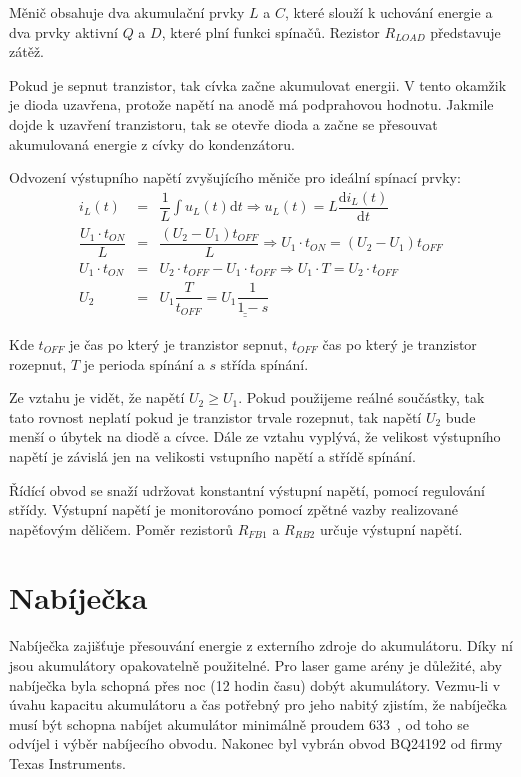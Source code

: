 Měnič obsahuje dva akumulační prvky $L$ a $C$, které slouží k uchování energie a dva prvky aktivní $Q$ a $D$, které plní funkci spínačů. Rezistor $R_{LOAD}$ představuje zátěž.

Pokud je sepnut tranzistor, tak cívka začne akumulovat energii. V tento okamžik je dioda uzavřena, protože napětí na anodě má podprahovou hodnotu. Jakmile dojde k uzavření tranzistoru, tak se otevře dioda a začne se přesouvat akumulovaná energie z cívky do kondenzátoru.

Odvození výstupního napětí zvyšujícího měniče pro ideální spínací prvky:
\begin{eqnarray}
    i_L(t) &=& \dfrac{1}{L} \int u_L(t) \mathrm{d}t \Rightarrow u_L(t) = L \dfrac{\mathrm{d}i_L(t)}{\mathrm{d}t}
    \nonumber\\
    \dfrac{U_1 \cdot t_{ON}}{L} &=& \dfrac{(U_2 - U_1) t_{OFF}}{L} \Rightarrow U_1 \cdot t_{ON} = (U_2 - U_1) t_{OFF}
    \nonumber\\
    U_1 \cdot t_{ON} &=& U_2 \cdot t_{OFF} - U_1 \cdot t_{OFF} \Rightarrow U_1 \cdot T = U_2 \cdot t_{OFF}
    \nonumber\\
    U_2 &=& U_1 \dfrac{T}{t_{OFF}} = \underline{\underline{U_1 \dfrac{1}{1-s}}}
    \nonumber
\end{eqnarray}

Kde $t_{OFF}$ je čas po který je tranzistor sepnut, $t_{OFF}$ čas po který je tranzistor rozepnut, $T$ je perioda spínání a $s$ střída spínání.

Ze vztahu je vidět, že napětí $U_2 \geq U_1$. Pokud použijeme reálné součástky, tak tato rovnost neplatí pokud je tranzistor trvale rozepnut, tak napětí $U_2$ bude menší o úbytek na diodě a cívce. Dále ze vztahu vyplývá, že velikost výstupního napětí je závislá jen na velikosti vstupního napětí a střídě spínání.

Řídící obvod se snaží udržovat konstantní výstupní napětí, pomocí regulování střídy. Výstupní napětí je monitorováno pomocí zpětné vazby realizované napěťovým děličem. Poměr rezistorů $R_{FB1}$ a $R_{RB2}$ určuje výstupní napětí.

\section{Nabíječka}
Nabíječka zajišťuje přesouvání energie z externího zdroje do akumulátoru. Díky ní jsou akumulátory opakovatelně použitelné. Pro laser game arény je důležité, aby nabíječka byla schopná přes noc (12 hodin času) dobýt akumulátory. Vezmu-li v úvahu kapacitu akumulátoru a čas potřebný pro jeho nabitý zjistím, že nabíječka musí být schopna nabíjet akumulátor minimálně proudem 633~, od toho se odvíjel i výběr nabíjecího obvodu. Nakonec byl vybrán obvod BQ24192 od firmy Texas Instruments.

